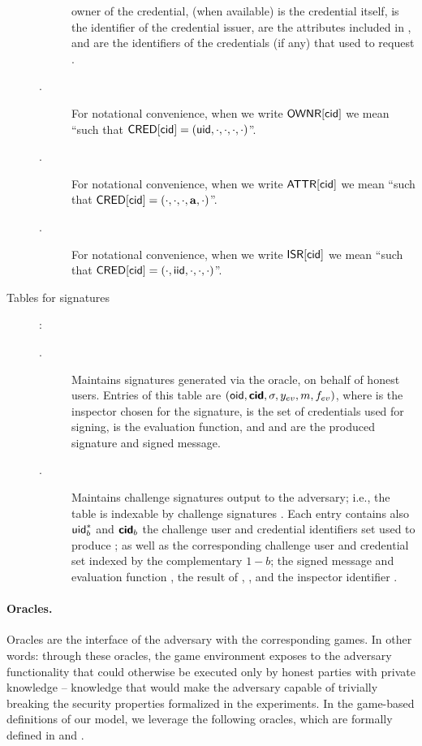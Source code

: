 \begin{description}
\begin{description}
    owner of the credential, \cred (when available) is the credential itself,
    \iid is the identifier of the credential issuer, \attrs are the attributes
    included in \cred, and \scid are the identifiers of the credentials (if any)
    that \uid used to request \cred.
  \item[\OWNR.] For notational convenience, when we write $\mathsf{OWNR}[\mathsf{cid}]$ we mean
    ``\uid such that $\mathsf{CRED}[\mathsf{cid}] = (\mathsf{uid}, \cdot, \cdot, \cdot, \cdot)$''.
  \item[\ATTR.] For notational convenience, when we write $\mathsf{ATTR}[\mathsf{cid}]$ we mean
    ``\attrs such that $\mathsf{CRED}[\mathsf{cid}] = (\cdot, \cdot, \cdot, \mathbf{a}, \cdot)$''.
  \item[\ISR.] For notational convenience, when we write $\mathsf{ISR}[\mathsf{cid}]$ we mean
    ``\iid such that $\mathsf{CRED}[\mathsf{cid}] = (\cdot, \mathsf{iid}, \cdot, \cdot, \cdot)$''.
  \end{description}
\item[Tables for signatures]:
  \begin{description}
  \item[\SIG.] Maintains signatures generated via the \SIGN oracle, on behalf
    of honest users. Entries of this table are $(\mathsf{oid},\boldsymbol{\mathsf{cid}},\sigma,y_{ev},m,
    f_{ev})$,
    where \oid is the inspector chosen for the signature, \scid is the set of
    credentials used for signing, \feval is the evaluation function, and \sig
    and \msg are the produced signature and signed message.
  \item[\CSIG.] Maintains challenge signatures output to the adversary; i.e.,
    the table is indexable by challenge signatures \csig.
    Each entry contains also $\mathsf{uid}^*_b$ and $\boldsymbol{\mathsf{cid}}_b$ the challenge user and
    credential identifiers set used to produce \csig; as well as the
    corresponding challenge user and credential set indexed by the complementary
    $1-b$; the signed message \msg and evaluation function \feval, the result of
    \feval, \yeval, and the inspector identifier \oid.
  \end{description}
\end{description}

\paragraph{Oracles.} %
Oracles are the interface of the adversary with the corresponding games. In
other words: through these oracles, the game environment exposes to the adversary
functionality that could otherwise be executed only by honest parties with
private knowledge -- knowledge that would make the adversary capable of
trivially breaking the security properties formalized in the experiments.
In the game-based definitions of our \UAS model, we leverage the following
oracles, which are formally defined in  and
. 

